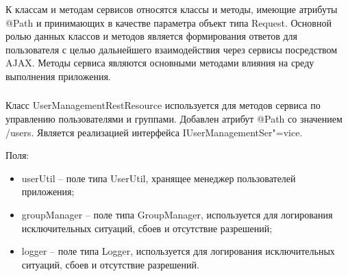 К классам и методам сервисов относятся классы и методы, имеющие атрибуты @Path и принимающих в качестве параметра объект типа Request. Основной ролью данных классов и методов является формирования ответов для пользователя с целью дальнейшего взаимодействия через сервисы посредством AJAX. Методы сервиса являются основными методами влияния на среду выполнения приложения.

\subsubsection{}
\label{sub:arch_and_mod:application_server_layer:user-management-rest-resource}

Класс UserManagementRestResource используется для методов сервиса по управлению пользователями и группами. Добавлен атрибут @Path со значением /users. Является реализацией интерфейса IUserManagementSer"=vice.

Поля:
\begin{itemize}
  \item userUtil – поле типа UserUtil, хранящее менеджер пользователей приложения;
  \item groupManager – поле типа GroupManager, используется для логирования исключительных ситуаций, сбоев и отсутствие разрешений;
  \item logger – поле типа Logger, используется для логирования исключительных ситуаций, сбоев и отсутствие разрешений.
\end{itemize}

